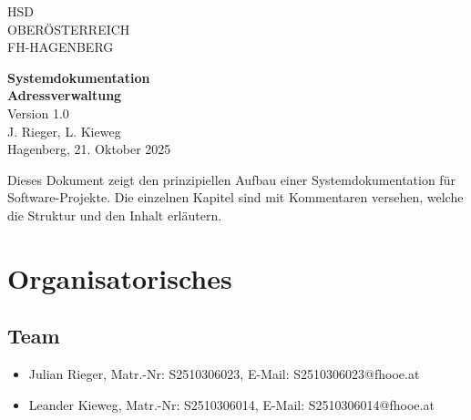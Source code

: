 \documentclass[a4paper,12pt]{article}
\begin{document}





\begin{titlepage}
\vspace*{-1cm}
\noindent
HSD\\
OBERÖSTERREICH\\
FH-HAGENBERG

\vspace{4cm}
\begin{center}
{\Huge \textbf{Systemdokumentation}}\\[1cm]
{\Large \textbf{Adressverwaltung}}\\[0.5cm]
{\large Version 1.0}\\[2cm]
{\large J. Rieger, L. Kieweg}\\[0.5cm]
{\large Hagenberg, 21. Oktober 2025}
\end{center}

\vspace{3cm}
\noindent
Dieses Dokument zeigt den prinzipiellen Aufbau einer Systemdokumentation für Software-Projekte. Die einzelnen Kapitel sind mit Kommentaren versehen, welche die Struktur und den Inhalt erläutern.
\end{titlepage}

\newpage
\tableofcontents
\newpage

\section{Organisatorisches}
\subsection {Team}
\begin{itemize}
\item Julian Rieger, Matr.-Nr: S2510306023, E-Mail: S2510306023@fhooe.at
\item Leander Kieweg, Matr.-Nr: S2510306014, E-Mail: S2510306014@fhooe.at
\end{itemize}
\end{document}
